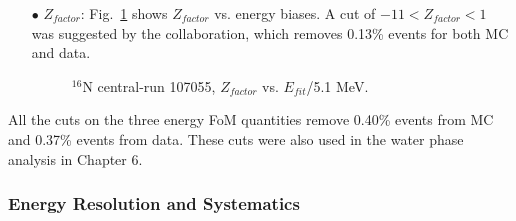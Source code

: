 \begin{itemize}
	\item[$\bullet$]$Z_{factor}$:
	Fig.~\ref{energyFOM_Zfactor} shows $Z_{factor}$ vs. energy biases. A cut of $-11<Z_{factor}<1$ was suggested by the collaboration, which removes 0.13\% events for both MC and data.		
	\begin{figure}[!htb]
		\centering
		\caption{$^{16}$N central-run 107055, $Z_{factor}$ vs. $E_{fit}$/5.1 MeV.\label{energyFOM_Zfactor}}
		
	\end{figure}
	
	
\end{itemize}

All the cuts on the three energy FoM quantities remove 0.40\% events from MC and 0.37\% events from data. These cuts were also used in the water phase analysis in Chapter 6.

\subsubsection{Energy Resolution and Systematics}

